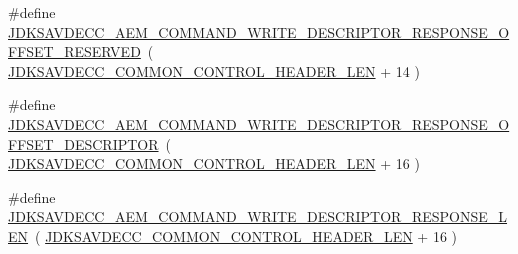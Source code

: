 \begin{DoxyCompactItemize}
\item 
\#define \hyperlink{group__command__write__descriptor__response_ga0e28982bb855eac494fd0db1b7225b38}{J\+D\+K\+S\+A\+V\+D\+E\+C\+C\+\_\+\+A\+E\+M\+\_\+\+C\+O\+M\+M\+A\+N\+D\+\_\+\+W\+R\+I\+T\+E\+\_\+\+D\+E\+S\+C\+R\+I\+P\+T\+O\+R\+\_\+\+R\+E\+S\+P\+O\+N\+S\+E\+\_\+\+O\+F\+F\+S\+E\+T\+\_\+\+R\+E\+S\+E\+R\+V\+ED}~( \hyperlink{group__jdksavdecc__avtp__common__control__header_gaae84052886fb1bb42f3bc5f85b741dff}{J\+D\+K\+S\+A\+V\+D\+E\+C\+C\+\_\+\+C\+O\+M\+M\+O\+N\+\_\+\+C\+O\+N\+T\+R\+O\+L\+\_\+\+H\+E\+A\+D\+E\+R\+\_\+\+L\+EN} + 14 )
\item 
\#define \hyperlink{group__command__write__descriptor__response_gaa05e5fe030e73aafcb3c0ae7dde8fa40}{J\+D\+K\+S\+A\+V\+D\+E\+C\+C\+\_\+\+A\+E\+M\+\_\+\+C\+O\+M\+M\+A\+N\+D\+\_\+\+W\+R\+I\+T\+E\+\_\+\+D\+E\+S\+C\+R\+I\+P\+T\+O\+R\+\_\+\+R\+E\+S\+P\+O\+N\+S\+E\+\_\+\+O\+F\+F\+S\+E\+T\+\_\+\+D\+E\+S\+C\+R\+I\+P\+T\+OR}~( \hyperlink{group__jdksavdecc__avtp__common__control__header_gaae84052886fb1bb42f3bc5f85b741dff}{J\+D\+K\+S\+A\+V\+D\+E\+C\+C\+\_\+\+C\+O\+M\+M\+O\+N\+\_\+\+C\+O\+N\+T\+R\+O\+L\+\_\+\+H\+E\+A\+D\+E\+R\+\_\+\+L\+EN} + 16 )
\item 
\#define \hyperlink{group__command__write__descriptor__response_ga0a9e23ef31c7afb4b787aa81e7a61f4c}{J\+D\+K\+S\+A\+V\+D\+E\+C\+C\+\_\+\+A\+E\+M\+\_\+\+C\+O\+M\+M\+A\+N\+D\+\_\+\+W\+R\+I\+T\+E\+\_\+\+D\+E\+S\+C\+R\+I\+P\+T\+O\+R\+\_\+\+R\+E\+S\+P\+O\+N\+S\+E\+\_\+\+L\+EN}~( \hyperlink{group__jdksavdecc__avtp__common__control__header_gaae84052886fb1bb42f3bc5f85b741dff}{J\+D\+K\+S\+A\+V\+D\+E\+C\+C\+\_\+\+C\+O\+M\+M\+O\+N\+\_\+\+C\+O\+N\+T\+R\+O\+L\+\_\+\+H\+E\+A\+D\+E\+R\+\_\+\+L\+EN} + 16 )
\end{DoxyCompactItemize}
